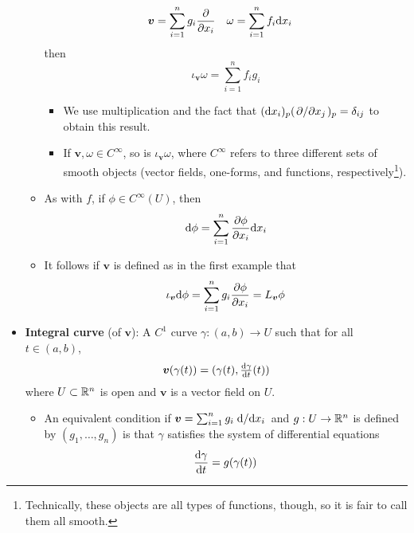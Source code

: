 \documentclass[../notes.tex]{subfiles}
\begin{document}
\begin{itemize}
\begin{itemize}
        \begin{align*}
            \bm{v} &= \sum_{i=1}^ng_i\pdv{x_i}&
            \omega &= \sum_{i=1}^nf_i\dd x_i
        \end{align*}
        then
        \begin{equation*}
            \iota_{\bm{v}}\omega = \sum_{i=1}^nf_ig_i
        \end{equation*}
        \begin{itemize}
            \item We use multiplication and the fact that $(\dd x_i)_p(\pdv*{x_j})_p=\delta_{ij}$ to obtain this result.
            \item If $\bm{v},\omega\in C^\infty$, so is $\iota_{\bm{v}}\omega$, where $C^\infty$ refers to three different sets of smooth objects (vector fields, one-forms, and functions, respectively\footnote{Technically, these objects are all types of functions, though, so it is fair to call them all smooth.}).
        \end{itemize}
        \item As with $f$, if $\phi\in C^\infty(U)$, then
        \begin{equation*}
            \dd\phi = \sum_{i=1}^n\pdv{\phi}{x_i}\dd x_i
        \end{equation*}
        \item It follows if $\bm{v}$ is defined as in the first example that
        \begin{equation*}
            \iota_{\bm{v}}\dd\phi = \sum_{i=1}^ng_i\pdv{\phi}{x_i}
            = L_{\bm{v}}\phi
        \end{equation*}
    \end{itemize}
    \item \textbf{Integral curve} (of $\bm{v}$): A $C^1$ curve $\gamma:(a,b)\to U$ such that for all $t\in(a,b)$,
    \begin{equation*}
        \bm{v}(\gamma(t)) = (\gamma(t),{\textstyle\dv{\gamma}{t}}(t))
    \end{equation*}
    where $U\subset\mathbb{R}^n$ is open and $\bm{v}$ is a vector field on $U$.
    \begin{itemize}
        \item An equivalent condition if $\bm{v}=\sum_{i=1}^ng_i\dv*{x_i}$ and $g:U\to\mathbb{R}^n$ is defined by $(g_1,\dots,g_n)$ is that $\gamma$ satisfies the system of differential equations
        \begin{equation*}
            \dv{\gamma}{t} = g(\gamma(t))
        \end{equation*}

\end{itemize}
\end{itemize}
\end{document}
